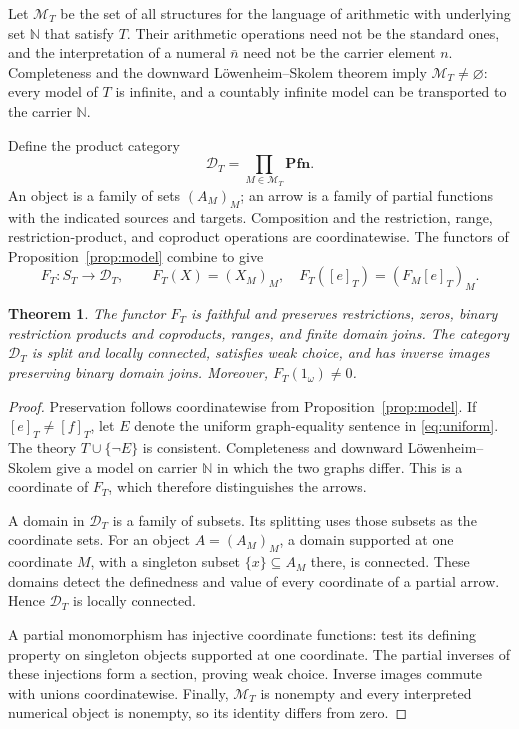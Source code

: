 \documentclass[11pt]{article}
\newtheorem{theorem}{Theorem}[section]
\newcommand{\N}{\mathbb N}
\newcommand{\Pfn}{\mathbf{Pfn}}
\begin{document}
Let $\mathcal M_T$ be the set of all structures for the language of
arithmetic with underlying set $\N$ that satisfy $T$. Their arithmetic
operations need not be the standard ones, and the interpretation of a
numeral $\bar n$ need not be the carrier element $n$. Completeness and
the downward L\"owenheim--Skolem theorem imply
$\mathcal M_T\ne\varnothing$: every model of $T$ is infinite, and a
countably infinite model can be transported to the carrier $\N$.

Define the product category
\[
 \mathcal D_T=\prod_{M\in\mathcal M_T}\Pfn.
\]
An object is a family of sets $(A_M)_M$; an arrow is a family of partial
functions with the indicated sources and targets. Composition and the
restriction, range, restriction-product, and coproduct operations are coordinatewise.
The functors of Proposition~\ref{prop:model} combine to give
\[
 F_T:S_T\longrightarrow\mathcal D_T,\qquad
 F_T(X)=(X_M)_M,\quad F_T([e]_T)=(F_M[e]_T)_M.
\]

\begin{theorem}\label{thm:faithful}
The functor $F_T$ is faithful and preserves restrictions, zeros, binary
restriction products and coproducts, ranges, and finite domain joins. The category
$\mathcal D_T$ is split and locally connected, satisfies weak choice,
and has inverse images preserving binary domain joins. Moreover,
$F_T(1_\omega)\ne0$.
\end{theorem}
\begin{proof}
Preservation follows coordinatewise from Proposition~\ref{prop:model}.
If $[e]_T\ne[f]_T$, let $E$ denote the uniform graph-equality sentence
in \eqref{eq:uniform}. The theory $T\cup\{\neg E\}$ is consistent.
Completeness and downward L\"owenheim--Skolem give a model on carrier
$\N$ in which the two graphs differ. This is a coordinate of $F_T$,
which therefore distinguishes the arrows.

A domain in $\mathcal D_T$ is a family of subsets. Its splitting uses
those subsets as the coordinate sets. For an object $A=(A_M)_M$, a
domain supported at one coordinate $M$, with a singleton subset
$\{x\}\subseteq A_M$ there, is connected. These domains detect the
definedness and value of every coordinate of a partial arrow. Hence
$\mathcal D_T$ is locally connected.

A partial monomorphism has injective coordinate functions: test its
defining property on singleton objects supported at one coordinate.
The partial inverses of these injections form a section, proving weak
choice. Inverse images commute with unions coordinatewise. Finally,
$\mathcal M_T$ is nonempty and every interpreted numerical object is
nonempty, so its identity differs from zero.
\end{proof}
\end{document}

